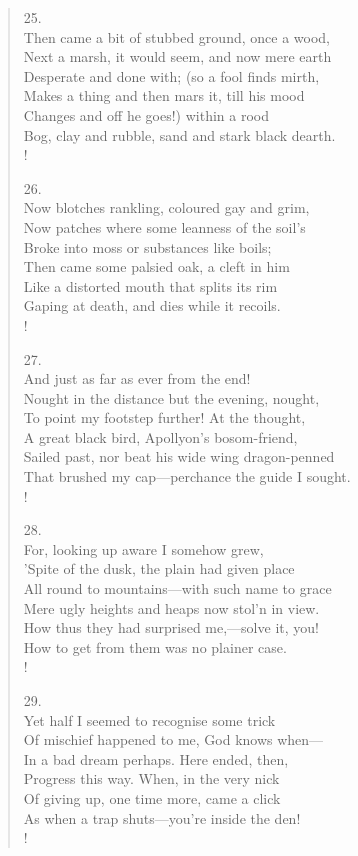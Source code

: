 \documentclass[10pt]{memoir}
\begin{document}
\begin{verse}
25.\\
Then came a bit of stubbed ground, once a wood,\\
\vin Next a marsh, it would seem, and now mere earth\\
\vin Desperate and done with; (so a fool finds mirth,\\
Makes a thing and then mars it, till his mood\\
Changes and off he goes!) within a rood\\
\vin Bog, clay and rubble, sand and stark black dearth.\\!

26.\\
Now blotches rankling, coloured gay and grim,\\
\vin Now patches where some leanness of the soil's\\
\vin Broke into moss or substances like boils;\\
Then came some palsied oak, a cleft in him\\
Like a distorted mouth that splits its rim\\
\vin Gaping at death, and dies while it recoils.\\!

27.\\
And just as far as ever from the end!\\
\vin Nought in the distance but the evening, nought,\\
\vin To point my footstep further! At the thought,\\
A great black bird, Apollyon's bosom-friend,\\
Sailed past, nor beat his wide wing dragon-penned\\
\vin That brushed my cap---perchance the guide I sought.\\!

28.\\
For, looking up aware I somehow grew,\\
\vin 'Spite of the dusk, the plain had given place\\
\vin All round to mountains---with such name to grace\\
Mere ugly heights and heaps now stol'n in view.\\
How thus they had surprised me,---solve it, you!\\
\vin How to get from them was no plainer case.\\!

29.\\
Yet half I seemed to recognise some trick\\
\vin Of mischief happened to me, God knows when---\\
\vin In a bad dream perhaps. Here ended, then,\\
Progress this way. When, in the very nick\\
Of giving up, one time more, came a click\\
\vin As when a trap shuts---you're inside the den!\\!


\end{verse}
\end{document}
